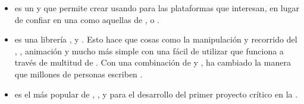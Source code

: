 \begin{itemize}
		\item
			\textbf{\phonegapNAME} es un \frameworkPC \freePC y \openSourcePC que permite crear \appsINT \mobileINT usando \webINT \apisAS para las plataformas que interesan, en lugar de confiar en una \apisAS \platformSpecificCPT como aquellas de \iosNAME, \windowsPhoneNAME o \androidNAME \cite{online_technology_phonegap_mobile_app_plataforms}.


		\item
			\textbf{\jqueryNAME} es una librería \javaScriptNAME \fastQA, \smallQA y \featureRichQA. Esto hace que cosas como la manipulación y recorrido del \htmlDocumentINT, \eventHandlingPL, animación y \ajaxNAME mucho más simple con una \apisAS fácil de utilizar que funciona a través de multitud de \browsersINT. Con una combinación de \versatilityQA y \extensibilityQA, \jqueryNAME ha cambiado la manera que millones de personas escriben \javaScriptNAME \cite{online_technology_jquery_officialSite}.
		
		\item \textbf{\bootstrap} es el \frameworkPC más popular de \htmlNAME, \cssNAME, y \javaScriptNAME para el desarrollo del primer proyecto \mobileINT crítico en la \webINT \cite{technology_bootstrap}.
	\end{itemize}


